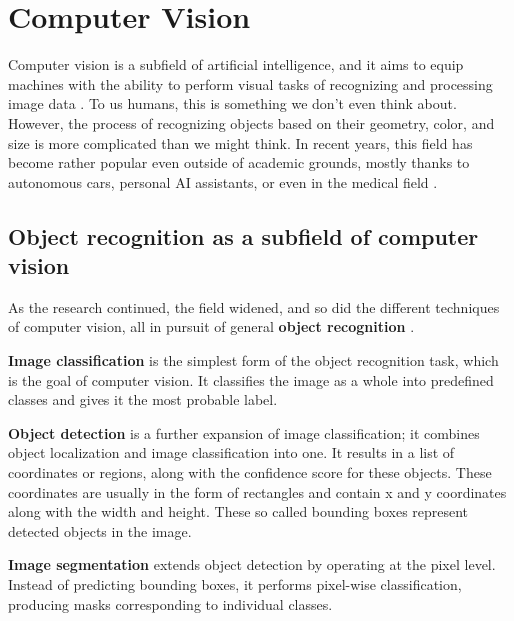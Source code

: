 \chapter{Computer Vision}
\label{ComputerVision}
Computer vision is a subfield of artificial intelligence, and it aims to equip machines with the ability to perform visual tasks of recognizing and processing image data \cite{computerVisionIBM}. To us humans, this is something we don't even think about. However, the process of recognizing objects based on their geometry, color, and size is more complicated than we might think. In recent years, this field has become rather popular even outside of academic grounds, mostly thanks to autonomous cars, personal AI assistants, or even in the medical field \cite{computerVisionNX}.



\section{Object recognition as a subfield of computer vision}
As the research continued, the field widened, and so did the different techniques of computer vision, all in pursuit of general \textbf{object recognition} \cite{computerVisionIBM}.

\textbf{Image classification} is the simplest form of the object recognition task, which is the goal of computer vision. It classifies the image as a whole into predefined classes and gives it the most probable label.

\textbf{Object detection} is a further expansion of image classification; it combines object localization and image classification into one. It results in a list of coordinates or regions, along with the confidence score for these objects. These coordinates are usually in the form of rectangles and contain x and y coordinates along with the width and height. These so called bounding boxes represent detected objects in the image.

\textbf{Image segmentation} extends object detection by operating at the pixel level. Instead of predicting bounding boxes, it performs pixel-wise classification, producing masks corresponding to individual classes.


